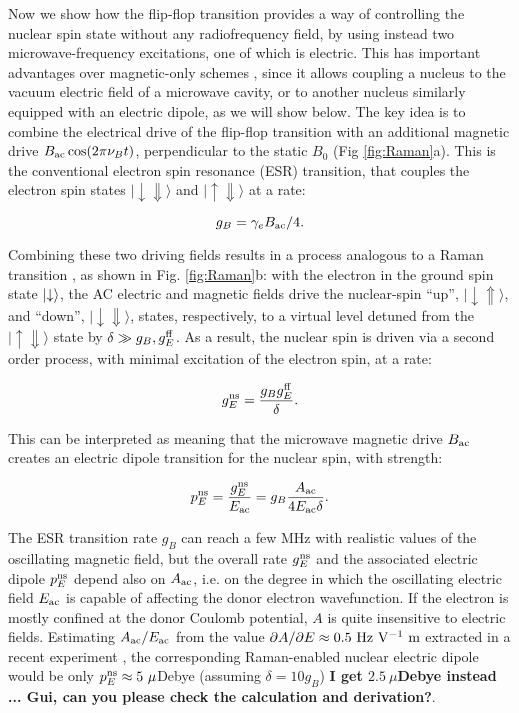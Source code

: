 \documentclass[
 aps,prb,twocolumn,
 amsmath,amssymb,superscriptaddress,
] {revtex4-1}
\begin{document}
Now we show how the flip-flop transition provides a way of controlling the nuclear spin state without any radiofrequency field, by using instead two microwave-frequency excitations, one of which is electric. This has important advantages over magnetic-only schemes \cite{Morton2008,Freer2017}, since it allows coupling a nucleus to the vacuum electric field of a microwave cavity, or to another nucleus similarly equipped with an electric dipole, as we will show below. The key idea is to combine the electrical drive of the flip-flop transition with an additional magnetic drive $B_{\rm ac}\cos(2\pi\nu_Bt)$, perpendicular to the static $B_0$ (Fig \ref{fig:Raman}a). This is the conventional electron spin resonance (ESR) transition, that couples the electron spin states $\lvert\downarrow\Downarrow\rangle$ and $\lvert\uparrow\Downarrow\rangle$ at a rate:

\begin{equation}
g_{B}=\gamma_eB_{\rm ac}/4.
\end{equation}

Combining these two driving fields results in a process analogous to a Raman transition \cite{Kok2010}, as shown in Fig. \ref{fig:Raman}b: with the electron in the ground spin state $\ket{\downarrow}$, the AC electric and magnetic fields drive the nuclear-spin ``up'', $\lvert\downarrow\Uparrow\rangle$, and ``down'', $\lvert\downarrow\Downarrow\rangle$, states, respectively, to a virtual level detuned from the $\lvert\uparrow\Downarrow\rangle$ state by $\delta\gg g_B,g_E^{\rm ff}$. As a result, the nuclear spin is driven via a second order process, with minimal excitation of the electron spin, at a rate:

\begin{equation} \label{eq:g_E^ns_simple}
g_E^{\rm ns}=\frac{g_B g_E^{\rm ff}}{\delta}.
\end{equation}

This can be interpreted as meaning that the microwave magnetic drive $B_{\rm ac}$ creates an electric dipole transition for the nuclear spin, with strength:

\begin{equation}
p_E^{\rm ns} = \frac{g_E^{\rm ns}}{E_{\rm ac}} = g_B \frac{A_{\rm ac}}{4 E_{\rm ac} \delta}.
\end{equation}

The ESR transition rate $g_B$ can reach a few MHz \cite{Pla2012} with realistic values of the oscillating magnetic field, but the overall rate $g_E^{\rm ns}$ and the associated electric dipole $p_E^{\rm ns}$ depend also on $A_{\rm ac}$, i.e. on the degree in which the oscillating electric field $E_{\rm ac}$ is capable of affecting the donor electron wavefunction. If the electron is mostly confined at the donor Coulomb potential, $A$ is quite insensitive to electric fields. Estimating $A_{\rm ac}/E_{\rm ac}$ from the value $\partial A/\partial E\approx0.5~{\rm Hz~V^{-1}~m}$ extracted in a recent experiment \cite{Laucht2015}, the corresponding Raman-enabled nuclear electric dipole would be only $p_E^{\rm ns} \approx 5~\mu$Debye (assuming $\delta=10g_B$) \textbf{I get $2.5~\mu$Debye instead ... Gui, can you please check the calculation and derivation?}. 
\end{document}
